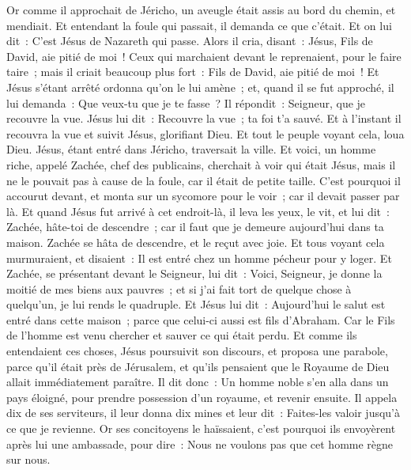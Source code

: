 \begin{multicols}{2}
Or comme il approchait de Jéricho, un aveugle était assis au bord du chemin, et mendiait.
Et entendant la foule qui passait, il demanda ce que c'était.
Et on lui dit~: C'est Jésus de Nazareth qui passe.
Alors il cria, disant~: Jésus, Fils de David, aie pitié de moi~!
Ceux qui marchaient devant le reprenaient, pour le faire taire~; mais il criait beaucoup plus fort~: Fils de David, aie pitié de moi~!
Et Jésus s'étant arrêté ordonna qu'on le lui amène~; et, quand il se fut approché,
il lui demanda~: Que veux-tu que je te fasse~? Il répondit~: Seigneur, que je recouvre la vue.
Jésus lui dit~: Recouvre la vue~; ta foi t'a sauvé.
Et à l'instant il recouvra la vue et suivit Jésus, glorifiant Dieu. Et tout le peuple voyant cela, loua Dieu.
\VerseOne{}Jésus, étant entré dans Jéricho, traversait la ville.
Et voici, un homme riche, appelé Zachée, chef des publicains, cherchait à voir qui était Jésus,
mais il ne le pouvait pas à cause de la foule, car il était de petite taille.
C'est pourquoi il accourut devant, et monta sur un sycomore pour le voir~; car il devait passer par là.
Et quand Jésus fut arrivé à cet endroit-là, il leva les yeux, le vit, et lui dit~: Zachée, hâte-toi de descendre~; car il faut que je demeure aujourd'hui dans ta maison.
Zachée se hâta de descendre, et le reçut avec joie.
Et tous voyant cela murmuraient, et disaient~: Il est entré chez un homme pécheur pour y loger.
Et Zachée, se présentant devant le Seigneur, lui dit~: Voici, Seigneur, je donne la moitié de mes biens aux pauvres~; et si j'ai fait tort de quelque chose à quelqu'un, je lui rends le quadruple.
Et Jésus lui dit~: Aujourd'hui le salut est entré dans cette maison~; parce que celui-ci aussi est fils d'Abraham.
Car le Fils de l'homme est venu chercher et sauver ce qui était perdu.
Et comme ils entendaient ces choses, Jésus poursuivit son discours, et proposa une parabole, parce qu'il était près de Jérusalem, et qu'ils pensaient que le Royaume de Dieu allait immédiatement paraître.
Il dit donc~: Un homme noble s'en alla dans un pays éloigné, pour prendre possession d'un royaume, et revenir ensuite.
Il appela dix de ses serviteurs, il leur donna dix mines et leur dit~: Faites-les valoir jusqu'à ce que je revienne.
Or ses concitoyens le haïssaient, c'est pourquoi ils envoyèrent après lui une ambassade, pour dire~: Nous ne voulons pas que cet homme règne sur nous.

\end{multicols}
